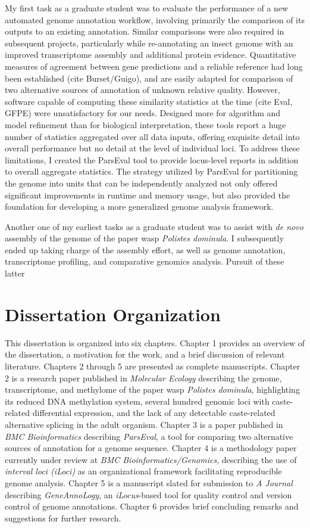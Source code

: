My first task as a graduate student was to evaluate the performance of a new automated genome annotation workflow, involving primarily the comparison of its outputs to an existing annotation.
Similar comparisons were also required in subsequent projects, particularly while re-annotating an insect genome with an improved transcriptome assembly and additional protein evidence.
Quantitative measures of agreement between gene predictions and a reliable reference had long been established (cite Burset/Guigo), and are easily adapted for comparison of two alternative sources of annotation of unknown relative quality.
However, software capable of computing these similarity statistics at the time (cite Eval, GFPE) were unsatisfactory for our needs.
Designed more for algorithm and model refinement than for biological interpretation, these tools report a huge number of statistics aggregated over all data inputs, offering exquisite detail into overall performance but no detail at the level of individual loci.
To address these limitations, I created the ParsEval tool to provide locus-level reports in addition to overall aggregate statistics.
The strategy utilized by ParsEval for partitioning the genome into units that can be independently analyzed not only offered significant improvements in runtime and memory usage, but also provided the foundation for developing a more generalized genome analysis framework.

Another one of my earliest tasks as a graduate student was to assist with \textit{de novo} assembly of the genome of the paper wasp \textit{Polistes dominula}.
I subsequently ended up taking charge of the assembly effort, as well as genome annotation, transcriptome profiling, and comparative genomics analysis.
Pursuit of these latter

\section{Dissertation Organization}

This dissertation is organized into six chapters.
Chapter 1 provides an overview of the dissertation, a motivation for the work, and a brief discussion of relevant literature.
Chapters 2 through 5 are presented as complete manuscripts.
Chapter 2 is a research paper published in \textit{Molecular Ecology} describing the genome, transcriptome, and methylome of the paper wasp \textit{Polistes dominula}, highlighting its reduced DNA methylation system, several hundred genomic loci with caste-related differential expression, and the lack of any detectable caste-related alternative splicing in the adult organism.
Chapter 3 is a paper published in \textit{BMC Bioinformatics} describing \textit{ParsEval}, a tool for comparing two alternative sources of annotation for a genome sequence.
Chapter 4 is a methodology paper currently under review at \textit{BMC Bioinformatics/Genomics}, describing the use of \textit{interval loci (iLoci)} as an organizational framework facilitating reproducible genome analysis.
Chapter 5 is a manuscript slated for submission to \textit{A Journal} describing \textit{GeneAnnoLogy}, an \textit{iLocus}-based tool for quality control and version control of genome annotations.
Chapter 6 provides brief concluding remarks and suggestions for further research.
